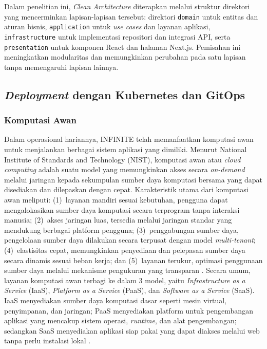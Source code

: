 Dalam penelitian ini, \textit{Clean Architecture} diterapkan melalui struktur direktori yang mencerminkan lapisan-lapisan tersebut: direktori \texttt{domain} untuk entitas dan aturan bisnis, \texttt{application} untuk \textit{use cases} dan layanan aplikasi, \texttt{infrastructure} untuk implementasi repositori dan integrasi API, serta \texttt{presentation} untuk komponen React dan halaman Next.js. Pemisahan ini meningkatkan modularitas dan memungkinkan perubahan pada satu lapisan tanpa memengaruhi lapisan lainnya.

\subsection{\textit{Deployment} dengan Kubernetes dan GitOps}

\subsubsection{Komputasi Awan}

Dalam operasional hariannya, INFINITE telah memanfaatkan komputasi awan untuk menjalankan berbagai sistem aplikasi yang dimiliki. Menurut National Institute of Standards and Technology (NIST), komputasi awan atau \textit{cloud computing} adalah suatu model yang memungkinkan akses secara \textit{on-demand} melalui jaringan kepada sekumpulan sumber daya komputasi bersama yang dapat disediakan dan dilepaskan dengan cepat. Karakteristik utama dari komputasi awan meliputi: (1)~layanan mandiri sesuai kebutuhan, pengguna dapat mengalokasikan sumber daya komputasi secara terprogram tanpa interaksi manusia; (2)~akses jaringan luas, tersedia melalui jaringan standar yang mendukung berbagai platform pengguna; (3)~penggabungan sumber daya, pengelolaan sumber daya dilakukan secara terpusat dengan model \textit{multi-tenant}; (4)~elastisitas cepat, memungkinkan penyediaan dan pelepasan sumber daya secara dinamis sesuai beban kerja; dan (5)~layanan terukur, optimasi penggunaan sumber daya melalui mekanisme pengukuran yang transparan \citep{Mell_2011_CloudComputing}. Secara umum, layanan komputasi awan terbagi ke dalam 3 model, yaitu \textit{Infrastructure as a Service} (IaaS), \textit{Platform as a Service} (PaaS), dan \textit{Software as a Service} (SaaS). IaaS menyediakan sumber daya komputasi dasar seperti mesin virtual, penyimpanan, dan jaringan; PaaS menyediakan platform untuk pengembangan aplikasi yang mencakup sistem operasi, \textit{runtime}, dan alat pengembangan; sedangkan SaaS menyediakan aplikasi siap pakai yang dapat diakses melalui web tanpa perlu instalasi lokal \citep{Younis_2024_Comprehensive}.

